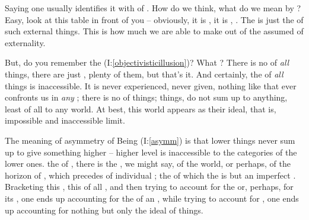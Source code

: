 
\pa Saying  one usually identifies it with 
of . How do we think, what do we mean by ?
Easy, look at this table in front of you -- obviously, it is , it is
, . The  is just the  of
such external things. This is how much we are able to make out of the assumed
 of externality.

But, do you remember the 
(I:\ref{objectivisticillusion})?  What ?  There is no 
of {\em all} things, there are just , plenty of them, but
that's it.  And certainly, the  of {\em all} things is
inaccessible.  It is never experienced, never given, nothing like that ever
confronts us in {\em any} ; there is no  of
things; things,  do not sum up to anything, least of all to any
world.  At best, this world appears as their ideal, that is, impossible and
inaccessible limit.

The meaning of asymmetry of Being (I:\ref{asymm}) is that lower things never sum
up to give something higher -- higher level is inaccessible to the categories of
the lower ones.  the  of , there is the
, we might say, of the world, or perhaps, of the horizon of
, which precedes  of individual ; the
 of which the  is but an imperfect .
Bracketing this , this  of all , and then
trying to account for the  or, perhaps, for its
, one ends up accounting for the  of an
, while trying to account for , one ends up accounting
for nothing but only  the ideal  of things.

